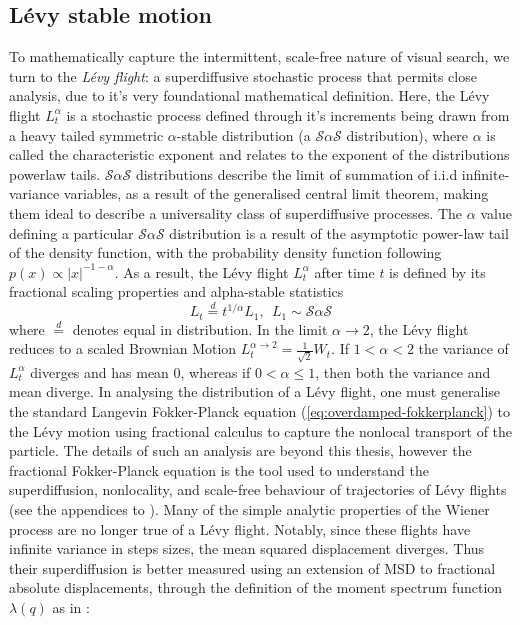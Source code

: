 \subsection{Lévy stable motion}\label{subsec:levy_motion}
To mathematically capture the intermittent, scale-free nature of visual search, we turn to the \textit{Lévy flight}: a superdiffusive stochastic process that permits close analysis, due to it's very foundational mathematical definition. Here, the Lévy flight $L_t^{\alpha}$ is a stochastic process defined through it's increments being drawn from a heavy tailed symmetric $\alpha$-stable distribution (a $\mathcal{S}\alpha\mathcal{S}$ distribution), where $\alpha$ is called the characteristic exponent and relates to the exponent of the distributions powerlaw tails. $\mathcal{S}\alpha\mathcal{S}$ distributions describe the limit of summation of i.i.d infinite-variance variables, as a result of the generalised central limit theorem, making them ideal to describe a universality class of superdiffusive processes. The $\alpha$ value defining a particular $\mathcal{S}\alpha\mathcal{S}$ distribution is a result of the asymptotic power-law tail of the density function, with the probability density function following $p(x) \propto |x|^{-1-\alpha}$. As a result, the Lévy flight $L_t^{\alpha}$ after time $t$ is defined by its fractional scaling properties and alpha-stable statistics
\begin{equation} \label{eq:levy_noise}
	L_t \stackrel{d}{=} t^{1/\alpha} L_1, \ \ L_1 \sim \mathcal{S}\alpha\mathcal{S}
\end{equation}
where $\stackrel{d}{=}$ denotes equal in distribution. In the limit $\alpha \rightarrow 2$, the Lévy flight reduces to a scaled Brownian Motion $L_t^{\alpha \rightarrow 2} = \frac{1}{\sqrt{2}}W_t$. If $1 < \alpha < 2$ the variance of $L_t^{\alpha}$ diverges and has mean 0, whereas if $0 < \alpha \leq 1$, then both the variance and mean diverge. In analysing the distribution of a Lévy flight, one must generalise the standard Langevin Fokker-Planck equation (\ref{eq:overdamped-fokkerplanck}) to the Lévy motion using fractional calculus to capture the nonlocal transport of the particle. The details of such an analysis are beyond this thesis, however the fractional Fokker-Planck equation is the tool used to understand the superdiffusion, nonlocality, and scale-free behaviour of trajectories of Lévy flights (see the appendices to \cite{qi_fractional_2022}). Many of the simple analytic properties of the Wiener process are no longer true of a Lévy flight. Notably, since these flights have infinite variance in steps sizes, the mean squared displacement diverges. Thus their superdiffusion is better measured using an extension of MSD to fractional absolute displacements, through the definition of the moment spectrum function $\lambda(q)$ as in \cite{vilk_strong_2025}:
